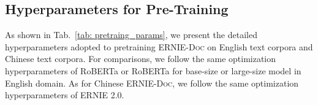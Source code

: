 \documentclass[11pt,a4paper]{article}
\newcommand{\mname}{\textsc{ERNIE-Doc}\xspace}
\begin{document}
\subsection{Hyperparameters for Pre-Training}
As shown in Tab.~\ref{tab: pretraing_params}, we present the detailed hyperparameters adopted to pretraining \mname on English text corpora and Chinese text corpora. For comparisons, we follow the same optimization hyperparameters of RoBERTa or RoBERTa \citep{liu2019roberta} for base-size or large-size model in English domain. As for Chinese \mname, we follow the same optimization hyperparameters of ERNIE 2.0. 

\begin{table}[!h]
\caption{Hyperparameters used for \mname pretraining.}
\label{tab: pretraing_params}
\vspace{-0.5cm}
\end{table}
\end{document}
